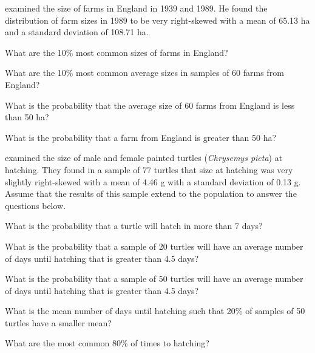 \documentclass[10pt,openany]{book}\usepackage[]{graphicx}\usepackage[]{color}
\begin{document}
\begin{exsection}
  \begin{minipage}{\textwidth}
  \item \label{revex:CLTFarms} \rhw{} \cite{Allanson1992} examined the size of farms in England in 1939 and 1989.  He found the distribution of farm sizes in 1989 to be very right-skewed with a mean of 65.13 ha and a standard deviation of 108.71 ha.
    \begin{Enumerate}
      \item What are the 10\% most common sizes of farms in England?
      \item What are the 10\% most common average sizes in samples of 60 farms from England?
      \item What is the probability that the average size of 60 farms from England is less than 50 ha?
      \item What is the probability that a farm from England is greater than 50 ha?
    \end{Enumerate}
  \end{minipage}
  \item \label{revex:CLTTurtles} \rhw{} \cite{JanzenMorjan2002} examined the size of male and female painted turtles (\textit{Chrysemys picta}) at hatching.  They found in a sample of 77 turtles that size at hatching was very slightly right-skewed with a mean of 4.46 g with a standard deviation of 0.13 g.  Assume that the results of this sample extend to the population to answer the questions below.
    \begin{Enumerate}
      \item What is the probability that a turtle will hatch in more than 7 days?
      \item What is the probability that a sample of 20 turtles will have an average number of days until hatching that is greater than 4.5 days?
      \item What is the probability that a sample of 50 turtles will have an average number of days until hatching that is greater than 4.5 days?
      \item What is the mean number of days until hatching such that 20\% of samples of 50 turtles have a smaller mean?
      \item What are the most common 80\% of times to hatching?
    \end{Enumerate}
\end{exsection}
\end{document}
